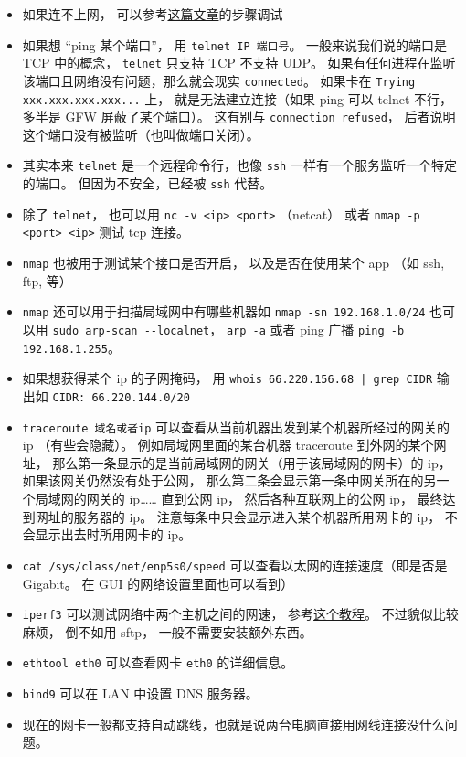 \begin{itemize}
\item 如果连不上网， 可以参考\href{https://upcloud.com/community/tutorials/troubleshoot-network-connectivity-linux-server/}{这篇文章}的步骤调试
\item 如果想 “ping 某个端口”， 用 \verb`telnet IP 端口号`。 一般来说我们说的端口是 TCP 中的概念， \verb`telnet` 只支持 TCP 不支持 UDP。 如果有任何进程在监听该端口且网络没有问题，那么就会现实 \verb`connected`。 如果卡在 \verb`Trying xxx.xxx.xxx.xxx...` 上， 就是无法建立连接（如果 ping 可以 telnet 不行， 多半是 GFW 屏蔽了某个端口）。 这有别与 \verb`connection refused`， 后者说明这个端口没有被监听（也叫做端口关闭）。
\item 其实本来 \verb`telnet` 是一个远程命令行，也像 \verb`ssh` 一样有一个服务监听一个特定的端口。 但因为不安全，已经被 \verb`ssh` 代替。
\item 除了 \verb`telnet`， 也可以用 \verb`nc -v <ip> <port>` （netcat） 或者 \verb`nmap -p <port> <ip>` 测试 tcp 连接。
\item \verb`nmap` 也被用于测试某个接口是否开启， 以及是否在使用某个 app （如 ssh, ftp, 等）
\item \verb`nmap` 还可以用于扫描局域网中有哪些机器如 \verb`nmap -sn 192.168.1.0/24` 也可以用 \verb`sudo arp-scan --localnet`， \verb`arp -a` 或者 ping 广播 \verb`ping -b 192.168.1.255`。
\item 如果想获得某个 ip 的子网掩码， 用 \verb`whois 66.220.156.68 | grep CIDR` 输出如 \verb`CIDR: 66.220.144.0/20`
\item \verb`traceroute 域名或者ip` 可以查看从当前机器出发到某个机器所经过的网关的 ip （有些会隐藏）。 例如局域网里面的某台机器 traceroute 到外网的某个网址， 那么第一条显示的是当前局域网的网关（用于该局域网的网卡）的 ip， 如果该网关仍然没有处于公网， 那么第二条会显示第一条中网关所在的另一个局域网的网关的 ip…… 直到公网 ip， 然后各种互联网上的公网 ip， 最终达到网址的服务器的 ip。 注意每条中只会显示进入某个机器所用网卡的 ip， 不会显示出去时所用网卡的 ip。
\item \verb`cat /sys/class/net/enp5s0/speed` 可以查看以太网的连接速度（即是否是 Gigabit。 在 GUI 的网络设置里面也可以看到）
\item \verb`iperf3` 可以测试网络中两个主机之间的网速， 参考\href{https://www.cyberciti.biz/faq/how-to-test-the-network-speedthroughput-between-two-linux-servers/}{这个教程}。 不过貌似比较麻烦， 倒不如用 sftp， 一般不需要安装额外东西。
\item \verb`ethtool eth0` 可以查看网卡 \verb`eth0` 的详细信息。
\item \verb`bind9` 可以在 LAN 中设置 DNS 服务器。
\item 现在的网卡一般都支持自动跳线，也就是说两台电脑直接用网线连接没什么问题。
\end{itemize}


